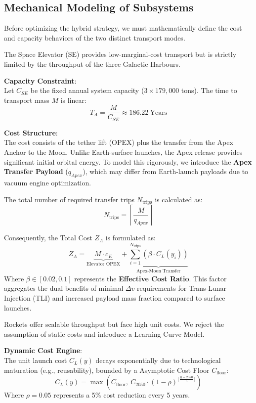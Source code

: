 \documentclass[11pt,letterpaper]{article}
\newcommand{\maxfunc}[2]{\max\left( #1, \ #2 \right)} %
\newcommand{\floor}[1]{\lfloor #1 \rfloor} %
\begin{document}
\subsection{Mechanical Modeling of Subsystems}
Before optimizing the hybrid strategy, we must mathematically define the cost and capacity behaviors of the two distinct transport modes.

The Space Elevator (SE) provides low-marginal-cost transport but is strictly limited by the throughput of the three Galactic Harbours.

\noindent \textbf{Capacity Constraint}:\\
Let $C_{SE}$ be the fixed annual system capacity ($3 \times 179,000$ tons). The time to transport mass $M$ is linear:
\[
T_A = \frac{M}{C_{SE}} \approx 186.22 \ \text{Years}
\]

\noindent \textbf{Cost Structure}:\\
The cost consists of the tether lift (OPEX) plus the transfer from the Apex Anchor to the Moon. Unlike Earth-surface launches, the Apex release provides significant initial orbital energy. To model this rigorously, we introduce the \textbf{Apex Transfer Payload} ($q_{Apex}$), which may differ from Earth-launch payloads due to vacuum engine optimization.

The total number of required transfer trips $N_{\text{trips}}$ is calculated as:
\[
N_{\text{trips}} = \left\lceil \frac{M}{q_{Apex}} \right\rceil
\]

Consequently, the Total Cost $Z_A$ is formulated as:
\[
Z_A = \underbrace{M \cdot c_E}_{\text{Elevator OPEX}} + \underbrace{\sum_{i=1}^{N_{\text{trips}}} \left( \beta \cdot C_L(y_i) \right)}_{\text{Apex-Moon Transfer}}
\]
Where $\beta \in [0.02, 0.1]$ represents the \textbf{Effective Cost Ratio}. This factor aggregates the dual benefits of minimal $\Delta v$ requirements for Trans-Lunar Injection (TLI) and increased payload mass fraction compared to surface launches.


Rockets offer scalable throughput but face high unit costs. We reject the assumption of static costs and introduce a Learning Curve Model.

\noindent \textbf{Dynamic Cost Engine}:\\
The unit launch cost $C_L(y)$ decays exponentially due to technological maturation (e.g., reusability), bounded by a Asymptotic Cost Floor $C_{\text{floor}}$:
\[
C_L(y) = \maxfunc{C_{\text{floor}}}{C_{2050} \cdot (1 - \rho)^{\floor{\frac{y - 2050}{5}}}}
\]
Where $\rho=0.05$ represents a 5\% cost reduction every 5 years.
\end{document}
